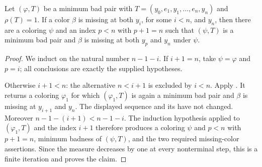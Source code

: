 \begin{helper}
Let \((\varphi,T)\) be a minimum bad pair with
\(T=(y_0,e_1,y_1,\ldots,e_n,y_n)\) and \(\rho(T)=1\).  If a color
\(\beta\) is missing at both \(y_i\), for some \(i<n\), and \(y_n\),
then there are a coloring \(\psi\) and an index \(p<n\) with
\(p+1=n\) such that \((\psi,T)\) is a minimum bad pair and \(\beta\)
is missing at both \(y_p\) and \(y_n\) under \(\psi\).
\end{helper}
\begin{proof}
We induct on the natural number \(n-1-i\).  If \(i+1=n\), take
\(\psi=\varphi\) and \(p=i\); all conclusions are exactly the supplied
hypotheses.

Otherwise \(i+1<n\): the alternative \(n<i+1\) is excluded by \(i<n\).
Apply .  It returns a coloring
\(\varphi_1\) for which \((\varphi_1,T)\) is again a minimum bad pair
and \(\beta\) is missing at \(y_{i+1}\) and \(y_n\).  The displayed
sequence and its  have not changed.  Moreover
\(n-1-(i+1)<n-1-i\).  The induction hypothesis applied to
\((\varphi_1,T)\) and the index \(i+1\) therefore produces a coloring
\(\psi\) and \(p<n\) with \(p+1=n\), minimum badness of
\((\psi,T)\), and the two required missing-color assertions.  Since the
measure decreases by one at every nonterminal step, this is a finite
iteration and proves the claim.
\end{proof}
